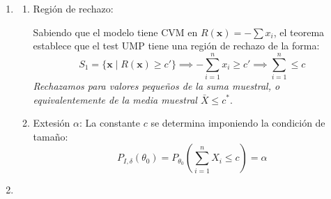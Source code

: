 \begin{enumerate}[label=\color{red}\textbf{\arabic*)}]
\begin{enumerate}[label=\color{red}\textbf{\alph*)}]
\begin{enumerate}[label=\arabic*)]
			                  Para dos valores del parámetro tales que $\theta_0<\theta_1$, calculamos el cociente de verosimilitudes:
			                  \[
				                  \dfrac{L(\mathbf{x};\theta_1)}{L(\mathbf{x};\theta_0)}=\dfrac{\theta_1^{2n}(\prod x_{i})\exp(-\theta_1\sum x_{i})}{\theta_0^{2n}(\prod x_{i})\exp(-\theta_0\sum x_{i})}=\left( \dfrac{\theta_1}{\theta_0} \right)^{2n}\exp \left( -(\theta_1-\theta_0)\sum_{i=1}^{n} x_{i} \right)
			                  \]
			                  Dado que $\theta_1>\theta_0$, el término $(\theta_1-\theta_0)$ es positivo. Por lo tanto, el exponente $-(\theta_1-\theta_0)\sum x_{i}$ es una función estrictamente \textbf{decreciente} respecto al estadístico $T(\mathbf{x})=\sum_{i=1}^{n} x_{i}$. Esto es matemáticamente equivalente a decir que el cociente es una función \textbf{creciente} (monótona) respecto al estadístico opuesto: \[
				                  R(\mathbf{x})=-\sum_{i=1}^{n} x_{i}
			                  \]
			                  \textit{Alternativamente, usando la familia exponencial uniparamétrica:} \[
				                  L(\mathbf{x};\theta)=\exp \left\{ -\theta\sum x_{i}+2n \ln\theta+ \ln \left( \prod x_{i} \right)  \right\}
			                  \]
			                  Aquí $A(\theta)=-\theta$. Como $A(\theta)$ es decreciente en $\theta$, el modelo tiene CVM en el estadístico $-T(\mathbf{x})=-\sum x_{i}$.
		            \end{enumerate}
		      \item {}

		            \begin{enumerate}[label=\arabic*)]
			            \item Región de rechazo:

			                  Sabiendo que el modelo tiene CVM en $R(\mathbf{x})=-\sum x_{i}$, el teorema establece que el test UMP tiene una región de rechazo de la forma: \[
				                  S_1=\{\mathbf{x}\mid R(\mathbf{x})\ge c'\} \implies - \sum_{i=1}^{n} x_{i}\ge c'\implies \sum_{i=1}^{n} \le c
			                  \]
			                  \textit{Rechazamos para valores pequeños de la suma muestral, o equivalentemente de la media muestral $\bar{X}\le c^*$}.
			            \item Extesión $\alpha$:
			                  La constante $c$ se determina imponiendo la condición de tamaño: \[
				                  P_{I,\delta}(\theta_0)=P_{\theta_0}\left( \sum_{i=1}^{n} X_i\le c \right)=\alpha
			                  \]
		            \end{enumerate}
		      \item {}


\end{enumerate}
\end{enumerate}
